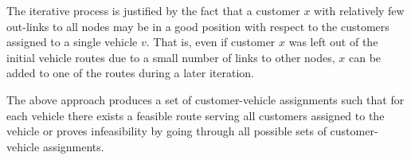 \documentclass[dissertation,draft*]{aaltoseries}
\begin{document}

% 
% 

The iterative process is justified by the fact that a customer $x$ with relatively few out-links to all nodes may 
be in a good position with respect to the customers assigned to a
single vehicle $v$. That is, even if customer $x$ was left out of the initial 
vehicle routes due to a small number of links to other nodes,
$x$ can be added to one of the routes during a later iteration. 

The above approach produces a set of customer-vehicle assignments 
such that for each vehicle there exists a feasible route serving all customers assigned to the vehicle
or proves infeasibility by going through all possible sets of customer-vehicle assignments.
\end{document}
